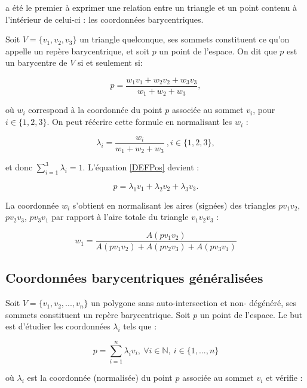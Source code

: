 \cite{Mob27} a été le premier à exprimer une relation entre un triangle et un
point contenu à l'intérieur de celui-ci : les coordonnées barycentriques.

Soit $V = \{v_1, v_2, v_3\}$ un triangle quelconque, ses sommets constituent ce
qu'on appelle un repère barycentrique, et soit $p$ un point de l'espace. On dit
que $p$ est un barycentre de $V$ si et seulement si:

\begin{equation}
  p = \frac{w_1 v_1 + w_2 v_2 + w_3 v_3}{w_1+w_2+w_3},
  \label{DEFPos}
\end{equation}

où $w_i$ correspond à la coordonnée du point $p$ associée au sommet $v_i$,
pour $i \in \{1, 2, 3\}$. On peut réécrire cette formule en normalisant les
$w_i$ :

\begin{equation}
  \lambda_i = \frac{w_i}{w_1+w_2+w_3} ~, i \in \{1, 2, 3\}, 
\end{equation}

et donc $\sum_{i=1}^3 \lambda_i = 1$. L'équation \ref{DEFPos} devient :

\begin{equation}
  p = \lambda_1 v_1 + \lambda_2 v_2 + \lambda_3 v_3.
\end{equation}

La coordonnée $w_i$ s'obtient en normalisant les aires (signées) des triangles
$pv_1v_2$, $pv_2v_3$, $pv_3v_1$ par rapport à l'aire totale du triangle
$v_1v_2v_3$ :

\begin{equation}
  w_1 = \frac{A(pv_1v_2)}{A(pv_1v_2)+A(pv_2v_3)+A(pv_3v_1)}
\end{equation}

\subsection{Coordonnées barycentriques généralisées}

Soit $V = \{v_1, v_2, ..., v_n\}$ un polygone sans auto-intersection et non-
dégénéré, ses sommets constituent un repère barycentrique. Soit $p$ un point
de l'espace. Le but est d'étudier les coordonnées $\lambda_i$ tels que :

\begin{equation}
  p = \sum_{i=1}^{n} \lambda_i v_i ,
  ~ \forall i \in \mathbb{N} ,~ i \in \{1,\text{...}, n\}
\end{equation}

où $\lambda_i$ est la coordonnée (normalisée) du point $p$ associée au sommet
$v_i$ et vérifie :

